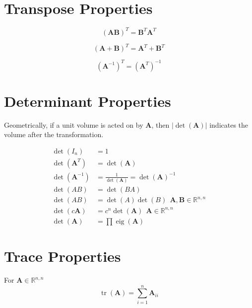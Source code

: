 \documentclass{book}
\newcommand{\mA}{\mathbf{A}}
\newcommand{\mB}{\mathbf{B}}
\DeclareMathOperator{\eig}{eig}
\DeclareMathOperator{\trace}{tr}
\newcommand{\sRnn}{\mathbb{R}^{n,n}}
\begin{document}



\tableofcontents















\chapter{Transpose Properties}

\begin{equation}
(\mA\mB)^T=\mB^T\mA^T
\end{equation}

\begin{equation}
(\mA+\mB)^T=\mA^T+\mB^T
\end{equation}

\begin{equation}
(\mA^{-1})^T=(\mA^T)^{-1}
\end{equation}


\chapter{Determinant Properties}

Geometrically, if a unit volume is acted on by $\mA$, then $|\det(\mA)|$ indicates the volume after the transformation.

\begin{align}
\det(I_n)     &= 1                                  \\
\det(\mA^T)   &= \det(\mA)                          \\
\det(\mA^{-1})&= \frac{1}{\det(\mA)}=\det(\mA)^{-1} \\
\det(AB)      &= \det(BA)                           \\
\det(AB)      &= \det(A)\det(B)~~\mA,\mB\in\sRnn    \\
\det(c\mA)    &= c^n\det(\mA)~~\mA\in\sRnn          \\
\det(\mA)     &= \prod \eig(\mA)                    
\end{align}


\chapter{Trace Properties}
For $\mA\in\sRnn$
\begin{equation}
\trace(\mA)=\sum_{i=1}^n \mA_{ii}
\end{equation}
\end{document}
